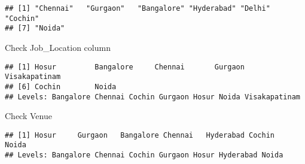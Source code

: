 \documentclass[]{article}
\newenvironment{Shaded}{\begin{snugshade}}{\end{snugshade}}
\newcommand{\KeywordTok}[1]{\textcolor[rgb]{0.13,0.29,0.53}{\textbf{#1}}}
\newcommand{\StringTok}[1]{\textcolor[rgb]{0.31,0.60,0.02}{#1}}
\newcommand{\CommentTok}[1]{\textcolor[rgb]{0.56,0.35,0.01}{\textit{#1}}}
\newcommand{\OperatorTok}[1]{\textcolor[rgb]{0.81,0.36,0.00}{\textbf{#1}}}
\newcommand{\NormalTok}[1]{#1}
\begin{document}
\begin{verbatim}
## [1] "Chennai"   "Gurgaon"   "Bangalore" "Hyderabad" "Delhi"     "Cochin"   
## [7] "Noida"
\end{verbatim}

Check Job\_Location column

\begin{Shaded}
\end{Shaded}

\begin{verbatim}
## [1] Hosur         Bangalore     Chennai       Gurgaon       Visakapatinam
## [6] Cochin        Noida        
## Levels: Bangalore Chennai Cochin Gurgaon Hosur Noida Visakapatinam
\end{verbatim}

\begin{Shaded}
\end{Shaded}

Check Venue

\begin{Shaded}
\end{Shaded}

\begin{verbatim}
## [1] Hosur     Gurgaon   Bangalore Chennai   Hyderabad Cochin    Noida    
## Levels: Bangalore Chennai Cochin Gurgaon Hosur Hyderabad Noida
\end{verbatim}

\begin{Shaded}
\end{Shaded}
\end{document}
